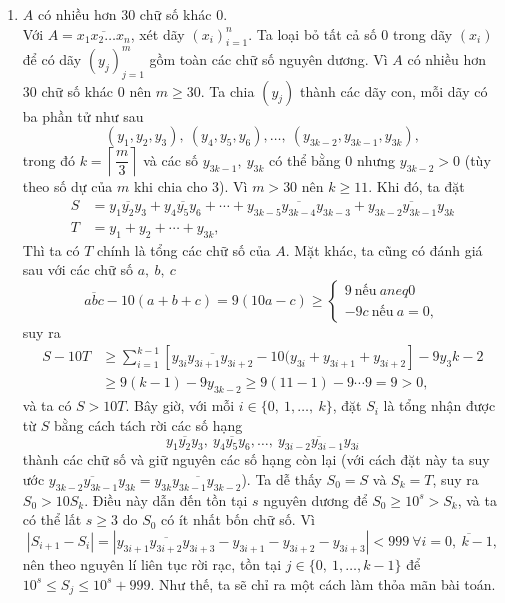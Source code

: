 \begin{vd} 
	\begin{enumerate}
		\item $A$ có nhiều hơn $30$ chữ số khác $0$.\\
		Với $A=\overline{x_1x_2\ldots x_n}$, xét dãy $(x_i)_{i=1}^n$. Ta loại bỏ tất cả số $0$ trong dãy $(x_i)$ để có dãy $(y_j)_{j=1}^m$ gồm toàn các chữ số nguyên dương. Vì $A$ có nhiều hơn $30$ chữ số khác $0$ nên $m\geq 30$. Ta chia $(y_j)$ thành các dãy con, mỗi dãy có ba phần tử như sau
		$$(y_1,y_2,y_3),\ (y_4,y_5,y_6),\ldots,\ (y_{3k-2},y_{3k-1},y_{3k}),$$ trong đó $k=\left\lceil {\dfrac{m}{3}}\right\rceil $ và các số $y_{3k-1},\ y_{3k}$ có thể bằng $0$ nhưng $y_{3k-2}>0$ (tùy theo số dự của $m$ khi chia cho $3$). Vì $m> 30$ nên  $k \geq 11$. Khi đó, ta đặt 
		\begin{align*}  S&=\overline{y_1y_2y_3}+\overline{y_4y_5y_6}+\cdots +\overline{y_{3k-5}y_{3k-4}y_{3k-3}} +\overline{y_{3k-2}y_{3k-1}y_{3k}}  \\ T&=y_1+y_2+\cdots +y_{3k},\end{align*}
		Thì ta có $T$ chính là tổng các chữ số của $A$. Mặt khác, ta cũng có đánh giá sau với các chữ số $a,\ b,\ c$
		$$\overline{abc}-10(a+b+c)=9(10a-c) \geq \begin{cases} 9 \ \text{nếu}\ aneq 0 \\ -9c\ \text{nếu}\ a=0, \end{cases}$$ suy ra 
		$$\begin{aligned} S-10T & \geq \sum\limits_{i=1}^{k-1} \left[ \overline{y_{3i}y_{3i+1}y_{3i+2}}-10(y_{3i}+y_{3i+1}+y_{3i+2} \right]-9y_3k-2 \\ & \geq 9(k-1)-9y_{3k-2} \geq 9(11-1)-9\cdots 9 =9>0, \end{aligned} $$ và ta có $S>10T$. Bây giờ, với mỗi $ i \in \{0,\ 1,\ldots,\ k \}$, đặt $S_i$ là tổng nhận được từ $S$ bằng cách tách rời các số hạng 
		$$\overline{y_1y_2y_3},\ \overline{y_4y_5y_6},\ldots,\ \overline{y_{3i-2}y_{3i-1}y_{3i}}$$ thành các chữ số và giữ nguyên các số hạng còn lại (với cách đặt này ta suy ước $\overline{y_{3k-2}y_{3k-1}y_{3k}}=\overline{y_{3k}y_{3k-1}y_{3k-2}}$). Ta dễ thấy $S_0=S$ và $S_k=T$, suy ra $S_0>10S_k$. Điều này dẫn đến tồn tại $s$ nguyên dương để $S_0\geq 10^s>S_k$, và ta có thể lất $s\geq 3$ do $S_0$ có ít nhất bốn chữ số. Vì 
		$$\left| S_{i+1}-S_i\right|=\left| \overline{y_{3i+1}y_{3i+2}y_{3i+3}}-y_{3i+1}-y_{3i+2}-y_{3i+3} \right|<999\ \forall i=\overline{0,\ k-1},$$ nên theo nguyên lí liên tục rời rạc, tồn tại $j\in \{0,\ 1,\ldots, k-1\}$ để $10^s\leq S_j \leq 10^s+999$. Như thế, ta sẽ chỉ ra một cách làm thỏa mãn bài toán. \\

\end{enumerate}
\end{vd}
